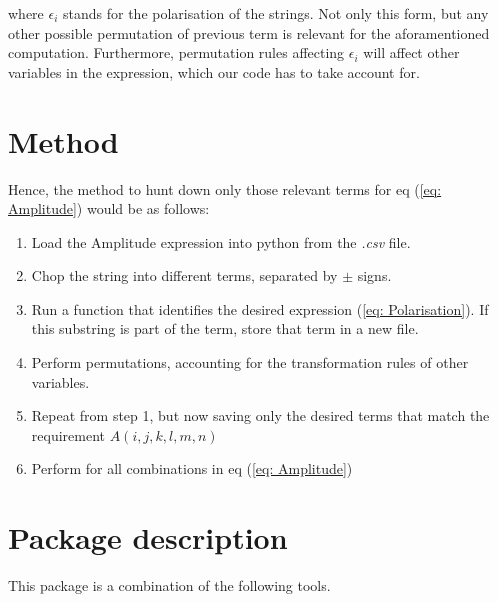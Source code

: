 \documentclass[11pt]{article} %
\begin{document}
where $\epsilon_{i}$ stands for the polarisation of the strings. Not only this form, but any other possible permutation of previous term is relevant for the aforamentioned computation. Furthermore, permutation rules affecting $\epsilon_{i}$ will affect other variables in the expression, which our code has to take account for.

\section{Method}

Hence, the method to hunt down only those relevant terms for eq (\ref{eq: Amplitude}) would be as follows:

\begin{enumerate}
    \item Load the Amplitude expression into python from the \textit{.csv} file.
    \item Chop the string into different terms, separated by $\pm$ signs.
    \item Run a function that identifies the desired expression (\ref{eq: Polarisation}). If this substring is part of the term, store that term in a new file.
    \item Perform permutations, accounting for the transformation rules of other variables.
    \item Repeat from step 1, but now saving only the desired terms that match the requirement $A(i, j, k, l, m, n)$
    \item Perform for all combinations in eq (\ref{eq: Amplitude})
\end{enumerate}

\section{Package description}

This package is a combination of the following tools.
\end{document}
